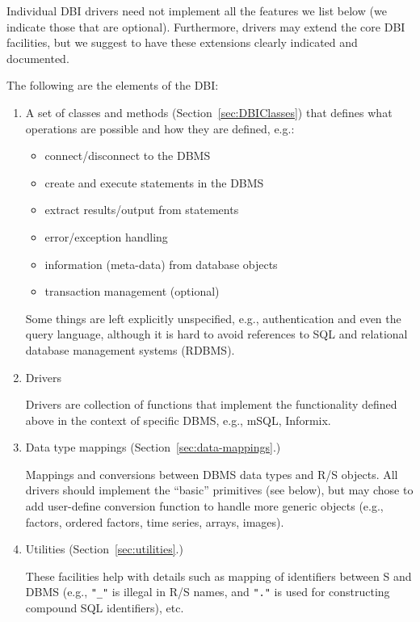 \documentclass[graphics,times,psfig,dvips,hyper]{article}
\begin{document}
Individual DBI drivers need not implement all the features we
list below (we indicate those that are optional).  Furthermore,
drivers may extend the core DBI facilities, but we suggest to have
these extensions clearly indicated and documented.

The following are the elements of the DBI:
\begin{enumerate}
\item A set of classes and methods (Section~\ref{sec:DBIClasses})
  that defines what operations are possible and how they are defined, 
  e.g.:
  \begin{itemize}
  \item connect/disconnect to the DBMS
  \item create and execute statements in the DBMS
  \item extract results/output from statements
  \item error/exception handling
  \item information (meta-data) from database objects
  \item transaction management (optional)
  \end{itemize}

  Some things are left explicitly unspecified, e.g., authentication
  and even the query language, although it is hard to avoid references 
  to SQL and relational database management systems (RDBMS).

\item Drivers
  
  Drivers are collection of functions that implement the functionality
  defined above in the context of specific DBMS, e.g., mSQL, Informix.

\item Data type mappings (Section~\ref{sec:data-mappings}.)
  
  Mappings and conversions between DBMS data types and R/S objects.
  All drivers should implement the ``basic'' primitives (see below), 
  but may chose to add user-define conversion function to handle
  more generic objects (e.g., factors, ordered factors, time series,
  arrays, images).

\item Utilities (Section~\ref{sec:utilities}.)
  
  These facilities help with details such as mapping of identifiers
  between S and DBMS (e.g., \texttt{"\_"} is illegal in R/S
  names, and \texttt{"."} is used for constructing compound SQL
  identifiers), etc.

\end{enumerate}
\end{document}
